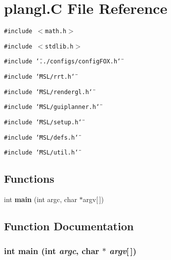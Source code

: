 \section{plangl.C File Reference}
\label{plangl_8C}
{\tt \#include $<$math.h$>$}\par
{\tt \#include $<$stdlib.h$>$}\par
{\tt \#include \char`\"{}../configs/config\-FOX.h\char`\"{}}\par
{\tt \#include \char`\"{}MSL/rrt.h\char`\"{}}\par
{\tt \#include \char`\"{}MSL/rendergl.h\char`\"{}}\par
{\tt \#include \char`\"{}MSL/guiplanner.h\char`\"{}}\par
{\tt \#include \char`\"{}MSL/setup.h\char`\"{}}\par
{\tt \#include \char`\"{}MSL/defs.h\char`\"{}}\par
{\tt \#include \char`\"{}MSL/util.h\char`\"{}}\par
\subsection*{Functions}
\begin{CompactItemize}
\item 
int {\bf main} (int argc, char $\ast$argv[$\,$])
\end{CompactItemize}


\subsection{Function Documentation}
\subsubsection{\setlength{\rightskip}{0pt plus 5cm}int main (int {\em argc}, char $\ast$ {\em argv}[$\,$])}\label{plangl_8C_a0}


